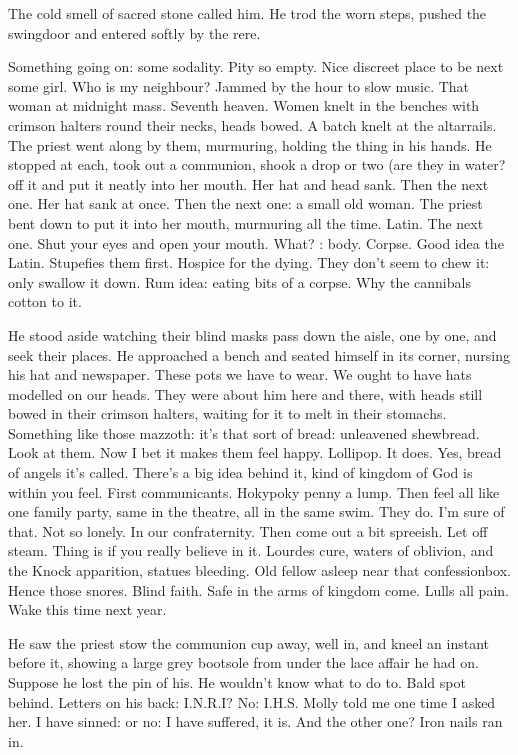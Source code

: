 The cold smell of sacred stone called him.
He trod the worn steps,
pushed the swingdoor
and entered softly by the rere.

Something going on: some sodality.
Pity so empty.
Nice discreet place to be next some girl.
Who is my neighbour?
Jammed by the hour to slow music.
That woman at midnight mass.
Seventh heaven.
Women knelt in the benches with crimson halters round their necks,
heads bowed.
A batch knelt at the altarrails.
The priest went along by them, murmuring,
holding the thing in his hands.
He stopped at each, took out a communion,
shook a drop or two (are they in water?
off it and put it neatly into her mouth.
Her hat and head sank.
Then the next one.
Her hat sank at once.
Then the next one:
a small old woman.
The priest bent down to put it into her mouth,
murmuring all the time.
Latin.
The next one.
Shut your eyes and open your mouth.
What?
:
body.
Corpse.
Good idea the Latin.
Stupefies them first.
Hospice for the dying.
They don't seem to chew it:
only swallow it down.
Rum idea:
eating bits of a corpse.
Why the cannibals cotton to it.

He stood aside
watching their blind masks pass down the aisle,
one by one,
and seek their places.
He approached a bench and seated himself in its corner,
nursing his hat and newspaper.
These pots we have to wear.
We ought to have hats modelled on our heads.
They were about him here and there,
with heads still bowed in their crimson halters,
waiting for it to melt in their stomachs.
Something like those mazzoth:
it's that sort of bread:
unleavened shewbread.
Look at them.
Now I bet it makes them feel happy.
Lollipop.
It does.
Yes, bread of angels it's called.
There's a big idea behind it,
kind of kingdom of God is within you feel.
First communicants.
Hokypoky penny a lump.
Then feel all like one family party,
same in the theatre, all in the same swim.
They do.
I'm sure of that.
Not so lonely.
In our confraternity.
Then come out a bit spreeish.
Let off steam.
Thing is if you really believe in it.
Lourdes cure,
waters of oblivion,
and the Knock apparition,
statues bleeding.
Old fellow asleep near that confessionbox.
Hence those snores.
Blind faith.
Safe in the arms of kingdom come.
Lulls all pain.
Wake this time next year.

He saw the priest stow the communion cup away,
well in,
and kneel an instant before it,
showing a large grey bootsole from under the lace affair he had on.
Suppose he lost the pin of his.
He wouldn't know what to do to.
Bald spot behind.
Letters on his back:
I.N.R.I?
No:
I.H.S.
Molly told me one time I asked her.
I have sinned:
or no:
I have suffered, it is.
And the other one?
Iron nails ran in.


